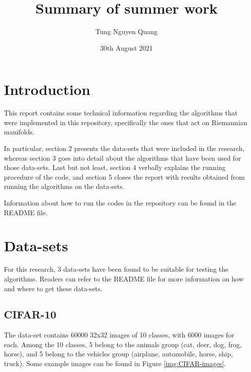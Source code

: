 \documentclass[12pt]{article}
\title{Summary of summer work}
\author{Tung Nguyen Quang}
\date{30th August 2021}
\begin{document}
\maketitle
\begin{sloppypar}

\section{Introduction}
This report contains some technical information regarding the algorithms that were implemented in this repository, specifically the ones that act on Riemannian manifolds. 

\noindent
In particular, section 2 presents the data-sets that were included in the research, whereas section 3 goes into detail about the algorithms that have been used for those data-sets. Last but not least, section 4 verbally explains the running procedure of the code, and section 5 closes the report with results obtained from running the algorithms on the data-sets.

\noindent
Information about how to run the codes in the repository can be found in the README file.


\section{Data-sets}
For this research, 3 data-sets have been found to be suitable for testing the algorithms. Readers can refer to the README file for more information on how and where to get these data-sets.

\subsection{CIFAR-10}
The data-set contains 60000 32x32 images of 10 classes, with 6000 images for each. Among the 10 classes, 5 belong to the animals group (cat, deer, dog, frog, horse), and 5 belong to the vehicles group (airplane, automobile, horse, ship, truck). Some example images can be found in Figure \ref{img:CIFAR-images}.


\end{sloppypar}
\end{document}
